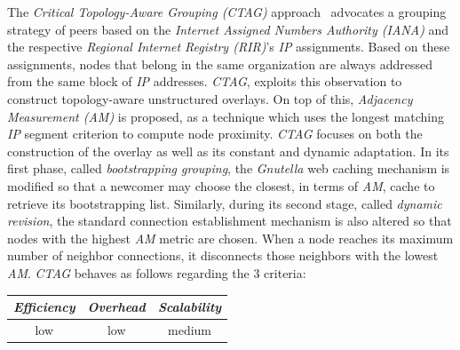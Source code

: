 The \emph{Critical Topology-Aware Grouping (CTAG)} approach~\cite{ZL2006}
advocates a grouping strategy of peers based on the 
\emph{Internet Assigned Numbers Authority (IANA)} and 
the respective \emph{Regional Internet Registry (RIR)}'s \emph{IP} assignments.
Based on these assignments, nodes that belong in the same 
organization are always addressed from the same block of \emph{IP} addresses.
\emph{CTAG}, exploits this observation to construct topology-aware unstructured
overlays. On top of this, \emph{Adjacency Measurement (AM)} is proposed, as
a technique which uses the longest matching \emph{IP} segment criterion to
compute node proximity. \emph{CTAG} focuses on both the construction of the
overlay as well as its constant and dynamic adaptation.
In its first phase, called \emph{bootstrapping grouping},
the {\sl Gnutella} web caching mechanism
is modified so that a newcomer may choose the closest, in terms of \emph{AM},
cache to retrieve its bootstrapping list. 
Similarly, during its second stage,
called \emph{dynamic revision}, the standard connection establishment mechanism
is also altered so that nodes with the highest \emph{AM} metric are chosen. 
When a node reaches its maximum number of neighbor
connections, it disconnects those neighbors with the lowest \emph{AM}.
\emph{CTAG} behaves as follows regarding the $3$ criteria:
\begin{center}
{\footnotesize
\begin{tabular}{ccc}
\emph{Efficiency} & \emph{Overhead} & \emph{Scalability} \\
\hline
low &
low &
medium
\end{tabular}
}
\end{center}



